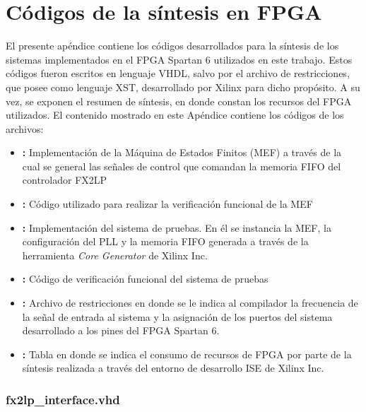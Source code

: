 \chapter{Códigos de la síntesis en FPGA}
\label{ap:vhdl}

	El presente apéndice contiene los códigos desarrollados para la síntesis de los sistemas implementados en el FPGA Spartan 6 utilizados en este trabajo. Estos códigos fueron escritos en lenguaje VHDL, salvo por el archivo de restricciones, que posee como lenguaje XST, desarrollado por Xilinx para dicho propósito. A su vez, se exponen el resumen de síntesis, en donde constan los recursos del FPGA utilizados.
 	El contenido mostrado en este Apéndice contiene los códigos de los archivos:
 	\begin{itemize}
		\item \textbf{:} Implementación de la Máquina de Estados Finitos (MEF) a través de la cual se general las señales de control que comandan la memoria FIFO del controlador FX2LP 
		
		\item \textbf{:} Código utilizado para realizar la verificación funcional de la MEF
		
		\item \textbf{:} Implementación del sistema de pruebas. En él se instancia la MEF, la configuración del PLL y la memoria FIFO generada a través de la herramienta \textit{Core Generator} de Xilinx Inc. 
		
		\item \textbf{:} Código de verificación funcional del sistema de pruebas 

		\item \textbf{:} Archivo de restricciones en donde se le indica al compilador la frecuencia de la señal de entrada al sistema y la asignación de los puertos del sistema desarrollado a los pines del FPGA Spartan 6.

		\item \textbf{:} Tabla en donde se indica el consumo de recursos de FPGA por parte de la síntesis realizada a través del entorno de desarrollo ISE de Xilinx Inc.
	\end{itemize}


	\subsection*{fx2lp\_interface.vhd}
		\label{ap:vhdl:iffx2}
		
	
